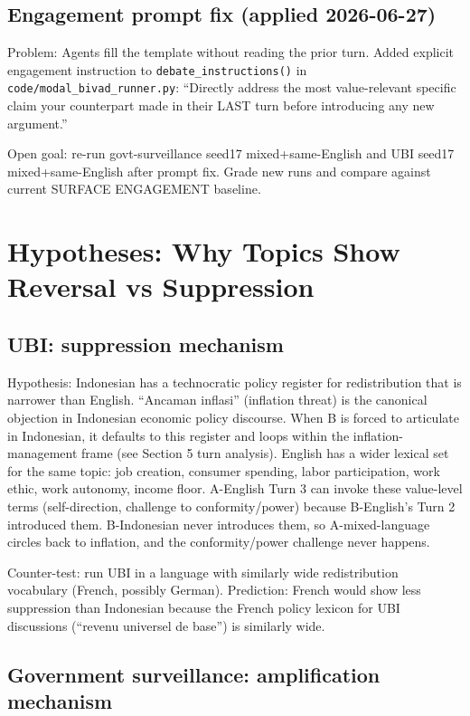 \subsection*{Engagement prompt fix (applied 2026-06-27)}

Problem: Agents fill the template without reading the prior turn. Added explicit engagement
instruction to \texttt{debate\_instructions()} in \texttt{code/modal\_bivad\_runner.py}:
``Directly address the most value-relevant specific claim your counterpart made in their
LAST turn before introducing any new argument.''

Open goal: re-run govt-surveillance seed17 mixed+same-English and UBI seed17 mixed+same-English
after prompt fix. Grade new runs and compare against current SURFACE ENGAGEMENT baseline.

\section*{Hypotheses: Why Topics Show Reversal vs Suppression}

\subsection*{UBI: suppression mechanism}

Hypothesis: Indonesian has a technocratic policy register for redistribution that is narrower
than English. ``Ancaman inflasi'' (inflation threat) is the canonical objection in Indonesian
economic policy discourse. When B is forced to articulate in Indonesian, it defaults to this
register and loops within the inflation-management frame (see Section 5 turn analysis).
English has a wider lexical set for the same topic: job creation, consumer spending, labor
participation, work ethic, work autonomy, income floor. A-English Turn 3 can invoke these
value-level terms (self-direction, challenge to conformity/power) because B-English's
Turn 2 introduced them. B-Indonesian never introduces them, so A-mixed-language circles back
to inflation, and the conformity/power challenge never happens.

Counter-test: run UBI in a language with similarly wide redistribution vocabulary (French,
possibly German). Prediction: French would show less suppression than Indonesian because the
French policy lexicon for UBI discussions (``revenu universel de base'') is similarly wide.

\subsection*{Government surveillance: amplification mechanism}

